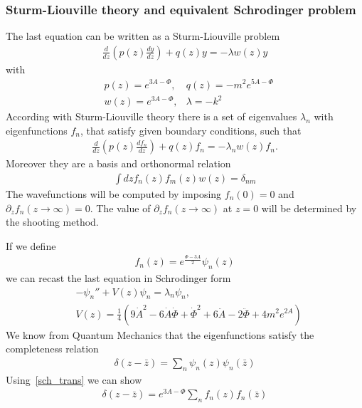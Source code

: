 \documentclass[12pt,a4paper]{article}
\begin{document}
\subsubsection{Sturm-Liouville theory and equivalent Schrodinger problem}

The last equation can be written as a Sturm-Liouville problem
\begin{align}
    \frac{d}{dz}\left( p\left(z\right) \frac{d y}{dz} \right) + q\left(z\right) y = - \lambda w\left(z\right) y
\end{align}
with
\begin{align}
    & p\left(z\right) =  e^{3 A - \Phi}, & q\left(z\right) =  -m^2  e^{5 A - \Phi} \\
    & w\left(z\right) = e^{3 A - \Phi}, & \lambda = - k^2
\end{align}
According with Sturm-Liouville theory there is a set of eigenvalues $\lambda_n$ with eigenfunctions $f_n$, that satisfy given boundary conditions, such that
\begin{align}
    \label{eq_eigenfunction}
    \frac{d}{dz}\left( p\left(z\right) \frac{d f_n}{dz} \right) + q\left(z\right) f_n = - \lambda_n w\left(z\right) f_n.
\end{align}
Moreover they are a basis and orthonormal relation
\begin{align}
    \int d z f_n\left(z\right) f_m \left( z \right) w \left(z\right) = \delta_{n m}
\end{align}
The wavefunctions will be computed by imposing $f_n\left(0\right) = 0$ and $\partial_z f_n \left( z \rightarrow \infty \right) = 0$. The value of $\partial_z f_n \left( z \rightarrow \infty \right)$ at $z=0$ will be determined by the shooting method.

If we define
\begin{align}
    \label{sch_trans}
    f_n\left(z\right) = e^{\frac{\Phi - 3 A}{2}} \psi_n \left(z\right)
\end{align}
we can recast the last equation in Schrodinger form
\begin{align}
    & -\psi_n'' + V\left(z\right) \psi_n =  \lambda_n \psi_n, \\
    & V\left( z \right) = \frac{1}{4} \left( 9 \dot{A}^2 - 6 \dot{A} \dot{\Phi} + \dot{\Phi}^2 + 6 \ddot{A} - 2 \ddot{\Phi} + 4 m^2 e^{2A}\right)
\end{align}
We know from Quantum Mechanics that the eigenfunctions satisfy the completeness relation
\begin{align}
    \delta \left( z - \bar{z} \right) = \sum_n \psi_n \left(z\right) \psi_n \left(\bar{z}\right) 
\end{align}
Using~\ref{sch_trans} we can show
\begin{align}
    \label{delta_eigen_decomp}
    \delta \left( z - \bar{z} \right) = e^{3 A - \Phi} \sum_n f_n \left(z \right) f_n\left(\bar{z}\right)
\end{align}
\end{document}

